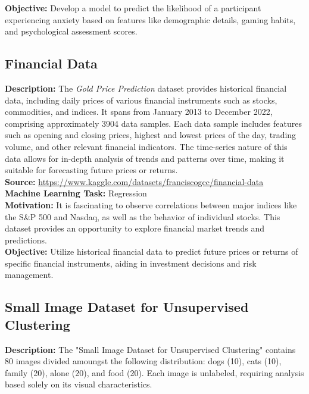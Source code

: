 \documentclass{article}
\begin{document}
\textbf{Objective:} Develop a model to predict the likelihood of a participant experiencing anxiety based on features like demographic details, gaming habits, and psychological assessment scores.

\subsection{Financial Data}
\textbf{Description:} 
The \textit{Gold Price Prediction} dataset provides historical financial data, including daily prices of various financial instruments such as stocks, commodities, and indices. It spans from January 2013 to December 2022, comprising approximately 3904 data samples. Each data sample includes features such as opening and closing prices, highest and lowest prices of the day, trading volume, and other relevant financial indicators. The time-series nature of this data allows for in-depth analysis of trends and patterns over time, making it suitable for forecasting future prices or returns. \\

\textbf{Source:} \href{https://www.kaggle.com/datasets/franciscogcc/financial-data}{https://www.kaggle.com/datasets/franciscogcc/financial-data} \\

\textbf{Machine Learning Task:} Regression \\

\textbf{Motivation:} It is fascinating to observe correlations between major indices like the S\&P 500 and Nasdaq, as well as the behavior of individual stocks. This dataset provides an opportunity to explore financial market trends and predictions. \\

\textbf{Objective:} Utilize historical financial data to predict future prices or returns of specific financial instruments, aiding in investment decisions and risk management. \\

\subsection{Small Image Dataset for Unsupervised Clustering}
\textbf{Description:} 
The "Small Image Dataset for Unsupervised Clustering" contains 80 images divided amoungst the following distribution: dogs (10), cats (10), family (20), alone (20), and food (20). Each image is unlabeled, requiring analysis based solely on its visual characteristics.\\
\end{document}
